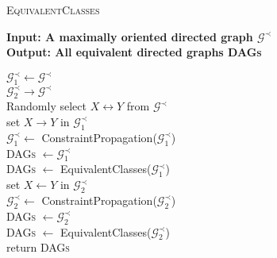\begin{algorithm}[H]
\caption{\textsc{EquivalentClasses}}
\label{algor:equivClass}
\textbf{Input: A maximally oriented directed graph $\mathcal{G}^\prec$} \\
\textbf{Output: All equivalent directed graphs \textsc{DAGs}}\\\vspace{-4mm}
	\begin{algorithmic}[1]
			\STATE $\mathcal{G}_1^\prec \leftarrow \mathcal{G}^\prec$\\ 
			\STATE $\mathcal{G}_2^\prec \rightarrow \mathcal{G}^\prec$\\
			\STATE Randomly select $X\leftrightarrow Y$ from $\mathcal{G}^\prec$\\
			\STATE set $X\rightarrow Y$ in $\mathcal{G}_1^\prec$\\
			\STATE $\mathcal{G}_1^\prec \leftarrow$ ConstraintPropagation($\mathcal{G}_1^\prec$)\\
				\STATE \textsc{DAGs} $\leftarrow \mathcal{G}_1^\prec$\\
			\ELSE
				\STATE \textsc{DAGs} $\leftarrow$ EquivalentClasses($\mathcal{G}_1^\prec$)\\
			\ENDIF	
			\STATE set $X\leftarrow Y$ in $\mathcal{G}_2^\prec$\\
			\STATE $\mathcal{G}_2^\prec \leftarrow$ ConstraintPropagation($\mathcal{G}_2^\prec$)\\
				\STATE \textsc{DAGs} $\leftarrow \mathcal{G}_2^\prec$\\
			\ELSE
				\STATE \textsc{DAGs} $\leftarrow$ EquivalentClasses($\mathcal{G}_2^\prec$)\\
			\ENDIF
		\ENDWHILE		
		\STATE return \textsc{DAGs}
	\end{algorithmic}
\end{algorithm}

